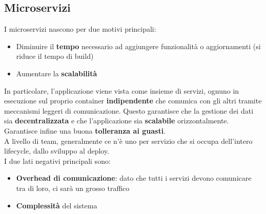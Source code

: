 \subsection{Microservizi}
I microservizi nascono per due motivi principali:
\begin{itemize}
	\item Diminuire il \textbf{tempo} necessario ad aggiungere funzionalità o aggiornamenti (si riduce il tempo di build)
	\item Aumentare la \textbf{scalabilità}
\end{itemize}
In particolare, l'applicazione viene vista come insieme di servizi, ognuno in esecuzione sul proprio container \textbf{indipendente} che comunica con gli altri tramite meccanismi leggeri di comunicazione. Questo garantisce che la gestione dei dati sia \textbf{decentralizzata} e che l'applicazione sia \textbf{scalabile} orizzontalmente. Garantisce infine una buona \textbf{tolleranza ai guasti}.\\
A livello di team, generalmente ce n'è uno per servizio che si occupa dell'intero lifecycle, dallo sviluppo al deploy.\\
I due lati negativi principali sono:
\begin{itemize}
	\item \textbf{Overhead di comunicazione}: dato che tutti i servizi devono comunicare tra di loro, ci sarà un grosso traffico
	\item \textbf{Complessità} del sistema
\end{itemize}
